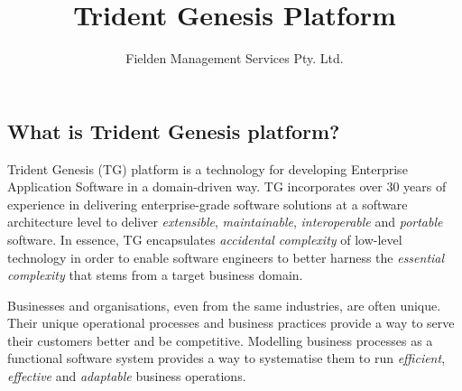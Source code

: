 \documentclass[a4paper,10pt,twocolumn,oneside,openright,final]{memoir}
\title{Trident Genesis Platform}
\author{Fielden Management Services Pty. Ltd.}
\begin{document}

\subsection*{What is Trident Genesis platform?}
  Trident Genesis (TG) platform is a technology for developing Enterprise Application Software in a domain-driven way.
  TG incorporates over 30 years of experience in delivering enterprise-grade software solutions at a software architecture level to deliver \emph{extensible}, \emph{maintainable}, \emph{interoperable} and \emph{portable} software.
  In essence, TG encapsulates \emph{accidental complexity} of low-level technology in order to enable software engineers to better harness the
  \emph{essential complexity} that stems from a target business domain.

  \vspace{3 mm}
  \noindent Businesses and organisations, even from the same industries, are often unique.
  Their unique operational processes and business practices provide a way to serve their customers better and be competitive.
  Modelling business processes as a functional software system provides a way to systematise them to run \emph{efficient}, \emph{effective} and \emph{adaptable} business operations.

\begin{figure}[!h]
    \vspace{-5pt}
    \centering
    \vspace{0pt}
  \end{figure}
\end{document}
